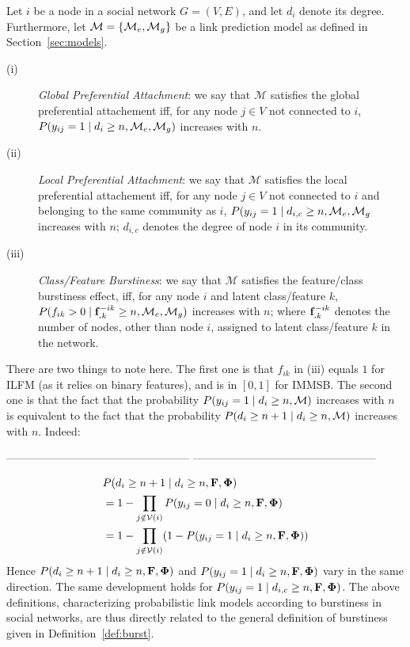 \begin{definition}
Let $i$ be a node in a social network $G=(V,E)$, and let $d_i$ denote its degree. Furthermore, let $\mathcal{M}=\{\mathcal{M}_e, \mathcal{M}_g\}$ be a link prediction model as defined in Section~\ref{sec:models}.
\begin{description}
 \item[(i)] \emph{Global Preferential Attachment}: we say that $\mathcal{M}$ satisfies the global preferential attachement iff, for any node $j \in V$ not connected to $i$, $P(y_{ij}=1 \mid d_i \ge n, \mathcal{M}_e, \mathcal{M}_g)$ increases with $n$.
 \item[(ii)] \emph{Local Preferential Attachment}: we say that $\mathcal{M}$ satisfies the local preferential attachement iff, for any node $j \in V$ not connected to $i$ and belonging to the same community as $i$, $P(y_{ij}=1 \mid d_{i,c} \ge n, \mathcal{M}_e, \mathcal{M}_g$ increases with $n$; $d_{i,c}$ denotes the degree of node $i$ in its community.
  \item[(iii)] \emph{Class/Feature Burstiness}: we say that $\mathcal{M}$ satisfies the feature/class burstiness effect, iff, for any node $i$ and latent class/feature $k$, $P(f_{ik} > 0 \mid \mathbf{f}_{\bm{.}k}^{-ik} \ge n, \mathcal{M}_e, \mathcal{M}_g)$ increases with $n$; where $\mathbf{f}_{\bm{.}k}^{-ik}$ denotes the number of nodes, other than node $i$, assigned to latent class/feature $k$ in the network.
\end{description}
\label{def:burst-soc-net}
\end{definition}
%
There are two things to note here. The first one is that $f_{ik}$ in (iii) equals $1$ for ILFM (as it relies on binary features), and is in $[0,1]$ for IMMSB. The second one is that the fact that the probability $P(y_{ij}=1 \mid d_i \ge n, \mathcal{M})$ increases with $n$ is equivalent to the fact that the probability $P(d_{i} \ge n+1 \mid d_i \ge n, \mathcal{M})$ increases with $n$. Indeed:

--------------------------------------------------
--------------------------------------------------


\begin{align}
&P(d_{i} \ge n+1 \mid d_i \ge n, \mathbf{F}, \mathbf{\Phi}) \nonumber \\
&= 1 - \prod_{j \notin \mathcal{V}(i)} P(y_{ij} = 0 \mid d_i \ge n, \mathbf{F}, \mathbf{\Phi}) \nonumber \\
&= 1 - \prod_{j \notin \mathcal{V}(i)} (1 - P(y_{ij} = 1 \mid d_i \ge n, \mathbf{F}, \mathbf{\Phi})) \nonumber
\end{align}
%
Hence $P(d_{i} \ge n+1 \mid d_i \ge n, \mathbf{F}, \mathbf{\Phi})$ and $P(y_{ij} = 1 \mid d_i \ge n, \mathbf{F}, \mathbf{\Phi})$ vary in the same direction. The same development holds for $P(y_{ij}=1 \mid d_{i,c} \ge n, \mathbf{F}, \mathbf{\Phi})$. The above definitions, characterizing probabilistic link models according to burstiness in social networks, are thus directly related to the general definition of burstiness given in Definition~\ref{def:burst}.


